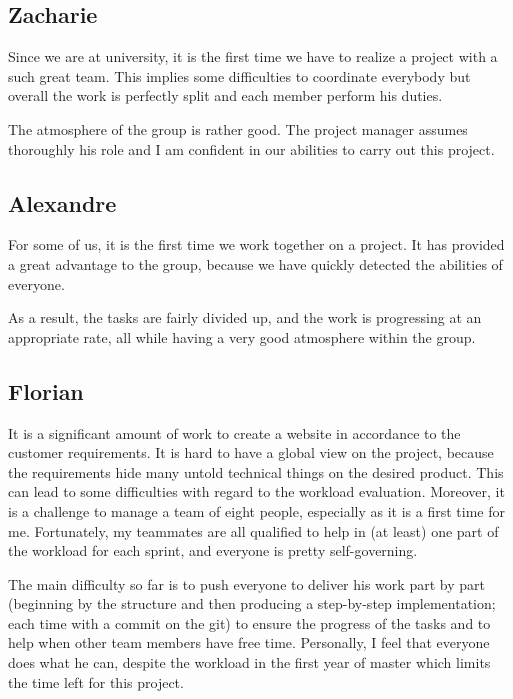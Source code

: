\subsection{Zacharie}

Since we are at university, it is the first time we have to realize a
project with a such great team. This implies some difficulties to
coordinate everybody but overall the work is perfectly split and each
member perform his duties. \newline

The atmosphere of the group is rather good. The project manager assumes
thoroughly his role and I am confident in our abilities to carry out this
project.

\subsection{Alexandre}

For some of us, it is the first time we work together on a project. It has
provided a great advantage to the group, because we have quickly detected
the abilities of everyone. \newline

As a result, the tasks are fairly divided up, and the work is progressing
at an appropriate rate, all while having a very good atmosphere within the
group.

\subsection{Florian}

It is a significant amount of work to create a website in accordance to the
customer requirements. It is hard to have a global view on the project,
because the requirements hide many untold technical things on the desired
product. This can lead to some difficulties with regard to the workload
evaluation. Moreover, it is a challenge to manage a team of eight people,
especially as it is a first time for me. Fortunately, my
teammates are all qualified to help in (at least) one part of the workload for
each sprint, and everyone is pretty self-governing. \newline

The main difficulty so far is to push everyone to deliver his work part by
part (beginning by the structure and then producing a step-by-step
implementation; each time with a commit on the git) to ensure the progress
of the tasks and to help when other team members have free time.
Personally, I feel that everyone does what he can, despite the workload in
the first year of master which limits the time left for this project.\newline
